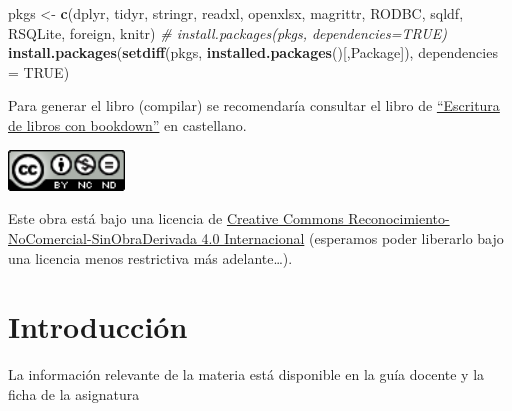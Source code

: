 \documentclass[
]{book}
\newenvironment{Shaded}{\begin{snugshade}}{\end{snugshade}}
\newcommand{\AttributeTok}[1]{\textcolor[rgb]{0.13,0.29,0.53}{#1}}
\newcommand{\CommentTok}[1]{\textcolor[rgb]{0.56,0.35,0.01}{\textit{#1}}}
\newcommand{\ConstantTok}[1]{\textcolor[rgb]{0.56,0.35,0.01}{#1}}
\newcommand{\FunctionTok}[1]{\textcolor[rgb]{0.13,0.29,0.53}{\textbf{#1}}}
\newcommand{\NormalTok}[1]{#1}
\newcommand{\OtherTok}[1]{\textcolor[rgb]{0.56,0.35,0.01}{#1}}
\newcommand{\StringTok}[1]{\textcolor[rgb]{0.31,0.60,0.02}{#1}}
\begin{document}
\begin{Shaded}
\begin{Highlighting}[]
\NormalTok{pkgs }\OtherTok{\textless{}{-}} \FunctionTok{c}\NormalTok{(}\StringTok{\textquotesingle{}dplyr\textquotesingle{}}\NormalTok{, }\StringTok{\textquotesingle{}tidyr\textquotesingle{}}\NormalTok{, }\StringTok{\textquotesingle{}stringr\textquotesingle{}}\NormalTok{, }\StringTok{\textquotesingle{}readxl\textquotesingle{}}\NormalTok{, }\StringTok{\textquotesingle{}openxlsx\textquotesingle{}}\NormalTok{, }\StringTok{\textquotesingle{}magrittr\textquotesingle{}}\NormalTok{, }
          \StringTok{\textquotesingle{}RODBC\textquotesingle{}}\NormalTok{, }\StringTok{\textquotesingle{}sqldf\textquotesingle{}}\NormalTok{, }\StringTok{\textquotesingle{}RSQLite\textquotesingle{}}\NormalTok{, }\StringTok{\textquotesingle{}foreign\textquotesingle{}}\NormalTok{, }\StringTok{\textquotesingle{}knitr\textquotesingle{}}\NormalTok{)}
\CommentTok{\# install.packages(pkgs, dependencies=TRUE)}
\FunctionTok{install.packages}\NormalTok{(}\FunctionTok{setdiff}\NormalTok{(pkgs, }\FunctionTok{installed.packages}\NormalTok{()[,}\StringTok{\textquotesingle{}Package\textquotesingle{}}\NormalTok{]), }
                 \AttributeTok{dependencies =} \ConstantTok{TRUE}\NormalTok{)}
\end{Highlighting}
\end{Shaded}

Para generar el libro (compilar) se recomendaría consultar el libro de \href{https://rubenfcasal.github.io/bookdown_intro}{``Escritura de libros con bookdown''} en castellano.

\includegraphics[width=1.22in]{images/by-nc-nd-88x31}

Este obra está bajo una licencia de \href{https://creativecommons.org/licenses/by-nc-nd/4.0/deed.es_ES}{Creative Commons Reconocimiento-NoComercial-SinObraDerivada 4.0 Internacional}
(esperamos poder liberarlo bajo una licencia menos restrictiva más adelante\ldots).

\hypertarget{introducciuxf3n}{%
\chapter{Introducción}\label{introducciuxf3n}}

La información relevante de la materia está disponible en la guía docente y la ficha de la asignatura
\end{document}
